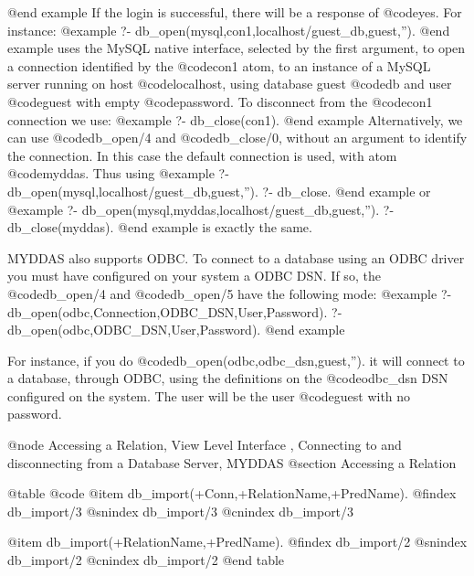 {{{{{{{{{@end example
If the login is successful, there will be a response of @code{yes}. For
instance:
 @example
?- db_open(mysql,con1,localhost/guest_db,guest,'').
@end example
uses the MySQL native interface, selected by the first argument, to open
a connection identified by the @code{con1} atom, to an instance of a
MySQL server running on host @code{localhost}, using database guest @code{db}
and user @code{guest} with empty @code{password}.  To disconnect from the @code{con1}
connection we use: 
@example
?- db_close(con1).
@end example
 Alternatively, we can use @code{db_open/4} and @code{db_close/0,} without an argument
to identify the connection. In this case the default connection is used,
with atom @code{myddas}. Thus using 
@example
?- db_open(mysql,localhost/guest_db,guest,''). 
?- db_close.  
@end example
or
@example
?- db_open(mysql,myddas,localhost/guest_db,guest,''). 
?- db_close(myddas). 
@end example
is exactly the same.

MYDDAS also supports ODBC. To connect to a database using an ODBC driver
you must have configured on your system a ODBC DSN. If so, the @code{db_open/4}
and @code{db_open/5} have the following mode:
@example
 ?- db_open(odbc,Connection,ODBC_DSN,User,Password). 
 ?- db_open(odbc,ODBC_DSN,User,Password).
@end example

For instance, if you do @code{db_open(odbc,odbc_dsn,guest,'')}. it will connect
to a database, through ODBC, using the definitions on the @code{odbc_dsn} DSN
configured on the system. The user will be the user @code{guest} with no
password.

@node Accessing a Relation, View Level Interface , Connecting to and disconnecting from a Database Server, MYDDAS 
@section Accessing a Relation

@table @code
@item db_import(+Conn,+RelationName,+PredName). 
@findex db_import/3
@snindex db_import/3
@cnindex db_import/3

@item db_import(+RelationName,+PredName).  
@findex db_import/2
@snindex db_import/2
@cnindex db_import/2
@end table

}}}}}}}}}
